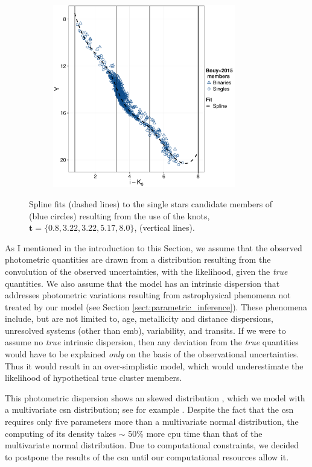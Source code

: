 \begin{figure}[ht!]
\begin{subfigure}[t]{0.48\textwidth}
    \end{subfigure}
     \begin{subfigure}[t]{0.48\textwidth}
      \includegraphics[page=7,height=8cm,width=\textwidth]{background/Figures/Photometry_fit.pdf}
        \caption{}
         
    \end{subfigure}
\caption{Spline fits (dashed lines) to the single stars candidate members of \citet{Bouy2015} (blue circles) resulting from the use of the knots, $\mathbf{t}=\{0.8,3.22,3.22,5.17,8.0\}$, (vertical lines).}
\label{fig:fitCMDs}
\end{figure}



As I mentioned in the introduction to this Section, we assume that the observed photometric quantities are drawn from a distribution resulting from the convolution of the observed uncertainties, with the likelihood, given the \emph{true} quantities. We also assume that the model has an intrinsic dispersion that addresses photometric variations resulting from astrophysical phenomena not treated by our model (see Section \ref{sect:parametric_inference}). These phenomena include, but are not limited to, age, metallicity and distance dispersions, unresolved systems (other than \gls{emb}), variability, and transits. If we were to assume no \emph{true} intrinsic dispersion, then any deviation from the \emph{true} quantities would have to be explained \emph{only} on the basis of the observational uncertainties. Thus it would result in an over-simplistic model, which would underestimate the likelihood of hypothetical true cluster members. 

This photometric dispersion shows an skewed distribution \cite[see Figure 2 of][which I reproduce in Fig. \ref{fig:luminosity_dispersion}]{2008ASPC..384..200H}, which we model with a multivariate \gls{csn} distribution; see for example \citet{Gonzalez-Farias2004,Gupta2004}. Despite the fact that the \gls{csn} requires only five parameters more than a multivariate normal distribution, the computing of its density takes $\sim$ 50\% more \gls{cpu} time than that of the multivariate normal distribution. Due to computational constraints, we decided to postpone the results of the \gls{csn} until our computational resources allow it. 

